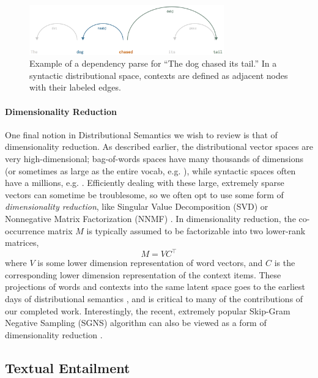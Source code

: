 \documentclass[12pt]{article}
\begin{document}
\begin{figure}
  \centering
  \includegraphics[width=0.75\textwidth]{figures/syn}
\caption{Example of a dependency parse for ``The dog chased its tail.'' In
a syntactic distributional space, contexts are defined as adjacent nodes
with their labeled edges.}
\label{fig:syn}
\end{figure}

\paragraph{Dimensionality Reduction}
One final notion in Distributional Semantics we wish to review is that of
dimensionality reduction. As described earlier, the distributional vector
spaces are very high-dimensional; bag-of-words spaces have many thousands of
dimensions (or sometimes as large as the entire vocab, e.g.
), while syntactic spaces often
have a millions, e.g. . Efficiently dealing with these
large, extremely sparse vectors can sometime be troublesome, so we often opt to
use some form of {\em dimensionality reduction}, like Singular Value
Decomposition (SVD) \cite{deerwester:1990:jsis,landauer:1997:pr} or Nonnegative
Matrix Factorization (NNMF) \cite{lee:2000:nips}. In dimensionality reduction,
the co-occurrence matrix $M$ is typically assumed to be factorizable into two
lower-rank matrices,
\begin{equation*}
  M = VC^{\top}
\end{equation*}
where $V$ is some lower dimension representation of word vectors, and $C$
is the corresponding lower dimension representation of the context items. These
projections of words and contexts into the same latent space goes to the
earliest days of distributional semantics \cite{deerwester:1990:jsis}, and
is critical to many of the contributions of our completed work.
Interestingly, the recent, extremely popular Skip-Gram Negative Sampling (SGNS)
algorithm \cite{mikolov:2013:iclr} can also be viewed as a form of
dimensionality reduction \cite{levy:2014:nips,levy:2015:tacl}.

\subsection{Textual Entailment}
\label{sec:textent}
\end{document}
